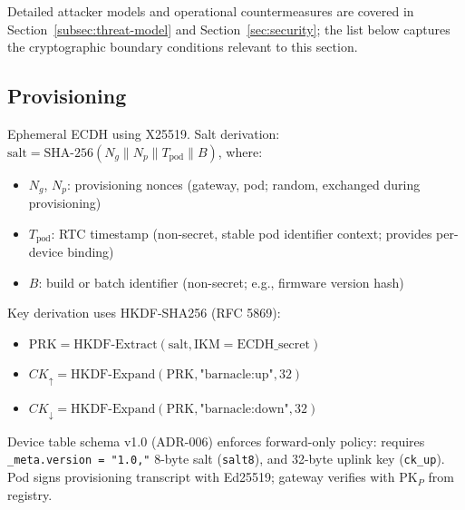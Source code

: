 Detailed attacker models and operational countermeasures are covered in Section~\ref{subsec:threat-model} and Section~\ref{sec:security}; the list below captures the cryptographic boundary conditions relevant to this section.

\subsection{Provisioning}\label{subsec:provisioning}
Ephemeral ECDH using X25519.
Salt derivation:\\ $\text{salt} = \text{SHA-256}(N_g \| N_p \| T_{\text{pod}} \| B)$, where:
\begin{itemize}[nosep]
    \item $N_g$, $N_p$: provisioning nonces (gateway, pod; random, exchanged during provisioning)
    \item $T_{\text{pod}}$: RTC timestamp (non-secret, stable pod identifier context; provides per-device binding)
    \item $B$: build or batch identifier (non-secret; e.g., firmware version hash)
\end{itemize}

Key derivation uses \ac{HKDF}-\ac{SHA}256 (\ac{RFC} 5869):
\begin{itemize}[nosep]
    \item $\text{PRK} = \text{HKDF-Extract}(\text{salt}, \text{IKM} = \text{ECDH\_secret})$
    \item $CK_{\uparrow} = \text{HKDF-Expand}(\text{PRK}, \text{"barnacle:up"}, 32)$ %
    \item $CK_{\downarrow} = \text{HKDF-Expand}(\text{PRK}, \text{"barnacle:down"}, 32)$ %
\end{itemize}

Device table schema v1.0 (\ac{ADR}-006) enforces forward-only policy: requires \texttt{\_meta.version = "1.0,"} 8-byte salt (\texttt{salt8}), and 32-byte uplink key (\texttt{ck\_up}). Pod signs provisioning transcript with Ed25519; gateway verifies with $\text{PK}_P$ from registry.

